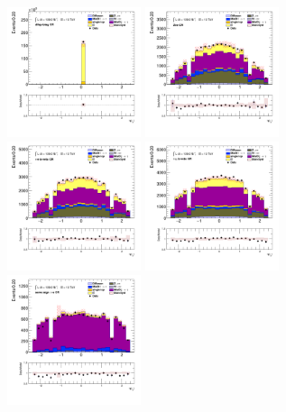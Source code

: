 		\begin{figure}[!htp]
			\begin{center}    
			\includegraphics[width=0.35\textwidth]{chapters/chapter6_HPlus/images/taulep/tau_0_eta_DILEP_BTAG.png}
			\includegraphics[width=0.35\textwidth]{chapters/chapter6_HPlus/images/taulep/tau_0_eta_ZEE.png} \\
			\includegraphics[width=0.35\textwidth]{chapters/chapter6_HPlus/images/taulep/tau_0_eta_TAUEL_BVETO.png} 
			\includegraphics[width=0.35\textwidth]{chapters/chapter6_HPlus/images/taulep/tau_0_eta_TAUMU_BVETO.png} \\
			\includegraphics[width=0.35\textwidth]{chapters/chapter6_HPlus/images/taulep/tau_0_eta_SS_TAUEL.png} 

\end{center}
\end{figure}
